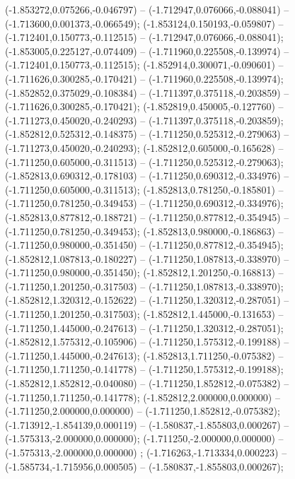  (-1.853272,0.075266,-0.046797) -- (-1.712947,0.076066,-0.088041) -- (-1.713600,0.001373,-0.066549);
 (-1.853124,0.150193,-0.059807) -- (-1.712401,0.150773,-0.112515) -- (-1.712947,0.076066,-0.088041);
 (-1.853005,0.225127,-0.074409) -- (-1.711960,0.225508,-0.139974) -- (-1.712401,0.150773,-0.112515);
 (-1.852914,0.300071,-0.090601) -- (-1.711626,0.300285,-0.170421) -- (-1.711960,0.225508,-0.139974);
 (-1.852852,0.375029,-0.108384) -- (-1.711397,0.375118,-0.203859) -- (-1.711626,0.300285,-0.170421);
 (-1.852819,0.450005,-0.127760) -- (-1.711273,0.450020,-0.240293) -- (-1.711397,0.375118,-0.203859);
 (-1.852812,0.525312,-0.148375) -- (-1.711250,0.525312,-0.279063) -- (-1.711273,0.450020,-0.240293);
 (-1.852812,0.605000,-0.165628) -- (-1.711250,0.605000,-0.311513) -- (-1.711250,0.525312,-0.279063);
 (-1.852813,0.690312,-0.178103) -- (-1.711250,0.690312,-0.334976) -- (-1.711250,0.605000,-0.311513);
 (-1.852813,0.781250,-0.185801) -- (-1.711250,0.781250,-0.349453) -- (-1.711250,0.690312,-0.334976);
 (-1.852813,0.877812,-0.188721) -- (-1.711250,0.877812,-0.354945) -- (-1.711250,0.781250,-0.349453);
 (-1.852813,0.980000,-0.186863) -- (-1.711250,0.980000,-0.351450) -- (-1.711250,0.877812,-0.354945);
 (-1.852812,1.087813,-0.180227) -- (-1.711250,1.087813,-0.338970) -- (-1.711250,0.980000,-0.351450);
 (-1.852812,1.201250,-0.168813) -- (-1.711250,1.201250,-0.317503) -- (-1.711250,1.087813,-0.338970);
 (-1.852812,1.320312,-0.152622) -- (-1.711250,1.320312,-0.287051) -- (-1.711250,1.201250,-0.317503);
 (-1.852812,1.445000,-0.131653) -- (-1.711250,1.445000,-0.247613) -- (-1.711250,1.320312,-0.287051);
 (-1.852812,1.575312,-0.105906) -- (-1.711250,1.575312,-0.199188) -- (-1.711250,1.445000,-0.247613);
 (-1.852813,1.711250,-0.075382) -- (-1.711250,1.711250,-0.141778) -- (-1.711250,1.575312,-0.199188);
 (-1.852812,1.852812,-0.040080) -- (-1.711250,1.852812,-0.075382) -- (-1.711250,1.711250,-0.141778);
 (-1.852812,2.000000,0.000000) -- (-1.711250,2.000000,0.000000) -- (-1.711250,1.852812,-0.075382);
 (-1.713912,-1.854139,0.000119) -- (-1.580837,-1.855803,0.000267) -- (-1.575313,-2.000000,0.000000);
 (-1.711250,-2.000000,0.000000) -- (-1.575313,-2.000000,0.000000) ;
 (-1.716263,-1.713334,0.000223) -- (-1.585734,-1.715956,0.000505) -- (-1.580837,-1.855803,0.000267);

